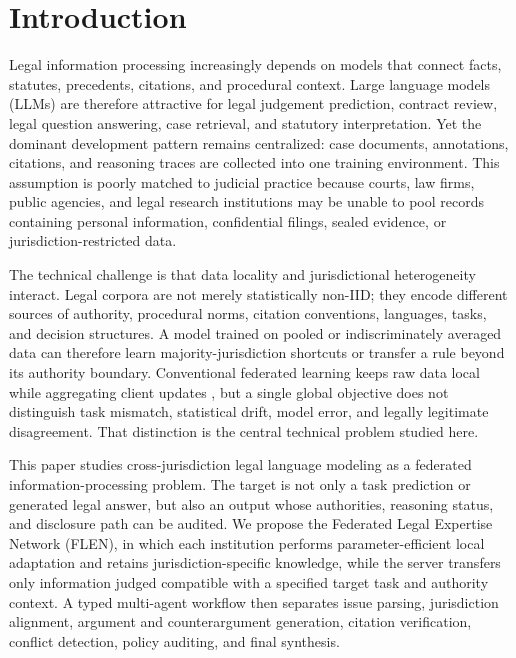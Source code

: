 \documentclass[preprint,12pt,authoryear]{elsarticle}
\begin{document}
\section{Introduction}

Legal information processing increasingly depends on models that connect facts, statutes, precedents, citations, and procedural context. Large language models (LLMs) are therefore attractive for legal judgement prediction, contract review, legal question answering, case retrieval, and statutory interpretation. Yet the dominant development pattern remains centralized: case documents, annotations, citations, and reasoning traces are collected into one training environment. This assumption is poorly matched to judicial practice because courts, law firms, public agencies, and legal research institutions may be unable to pool records containing personal information, confidential filings, sealed evidence, or jurisdiction-restricted data.

The technical challenge is that data locality and jurisdictional heterogeneity interact. Legal corpora are not merely statistically non-IID; they encode different sources of authority, procedural norms, citation conventions, languages, tasks, and decision structures. A model trained on pooled or indiscriminately averaged data can therefore learn majority-jurisdiction shortcuts or transfer a rule beyond its authority boundary. Conventional federated learning keeps raw data local while aggregating client updates \citep{mcmahan2017communication,kairouz2021advances}, but a single global objective does not distinguish task mismatch, statistical drift, model error, and legally legitimate disagreement. That distinction is the central technical problem studied here.

This paper studies cross-jurisdiction legal language modeling as a federated information-processing problem. The target is not only a task prediction or generated legal answer, but also an output whose authorities, reasoning status, and disclosure path can be audited. We propose the Federated Legal Expertise Network (FLEN), in which each institution performs parameter-efficient local adaptation and retains jurisdiction-specific knowledge, while the server transfers only information judged compatible with a specified target task and authority context. A typed multi-agent workflow then separates issue parsing, jurisdiction alignment, argument and counterargument generation, citation verification, conflict detection, policy auditing, and final synthesis.
\end{document}
